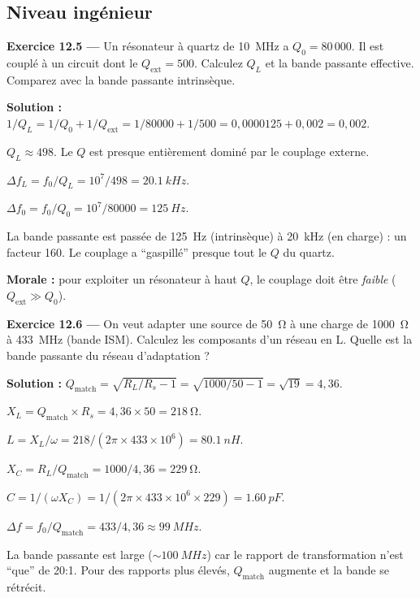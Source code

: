 \documentclass[12pt,a4paper,twoside]{book}
\begin{document}
\subsection*{Niveau ingénieur}

\textbf{Exercice 12.5 ---} Un résonateur à quartz de \SI{10}{MHz} a $Q_0 = 80\,000$. Il est couplé à un circuit dont le $Q_{\text{ext}} = 500$. Calculez $Q_L$ et la bande passante effective. Comparez avec la bande passante intrinsèque.

\begin{pratique}
\textbf{Solution :} $1/Q_L = 1/Q_0 + 1/Q_{\text{ext}} = 1/80000 + 1/500 = 0{,}0000125 + 0{,}002 = 0{,}002$.

$Q_L \approx 498$. Le $Q$ est presque entièrement dominé par le couplage externe.

$\Delta f_L = f_0/Q_L = 10^7/498 = \SI{20.1}{kHz}$.

$\Delta f_0 = f_0/Q_0 = 10^7/80000 = \SI{125}{Hz}$.

La bande passante est passée de \SI{125}{Hz} (intrinsèque) à \SI{20}{kHz} (en charge) : un facteur 160. Le couplage a ``gaspillé'' presque tout le $Q$ du quartz.

\textbf{Morale :} pour exploiter un résonateur à haut $Q$, le couplage doit être \textit{faible} ($Q_{\text{ext}} \gg Q_0$).
\end{pratique}

\textbf{Exercice 12.6 ---} On veut adapter une source de \SI{50}{\ohm} à une charge de \SI{1000}{\ohm} à \SI{433}{MHz} (bande ISM). Calculez les composants d'un réseau en L. Quelle est la bande passante du réseau d'adaptation ?

\begin{pratique}
\textbf{Solution :} $Q_{\text{match}} = \sqrt{R_L/R_s - 1} = \sqrt{1000/50 - 1} = \sqrt{19} = 4{,}36$.

$X_L = Q_{\text{match}}\times R_s = 4{,}36\times50 = \SI{218}{\ohm}$.

$L = X_L/\omega = 218/(2\pi\times433\times10^6) = \SI{80.1}{nH}$.

$X_C = R_L/Q_{\text{match}} = 1000/4{,}36 = \SI{229}{\ohm}$.

$C = 1/(\omega X_C) = 1/(2\pi\times433\times10^6\times229) = \SI{1.60}{pF}$.

$\Delta f = f_0/Q_{\text{match}} = 433/4{,}36 \approx \SI{99}{MHz}$.

La bande passante est large ($\sim\SI{100}{MHz}$) car le rapport de transformation n'est ``que'' de 20:1. Pour des rapports plus élevés, $Q_{\text{match}}$ augmente et la bande se rétrécit.
\end{pratique}
\end{document}
